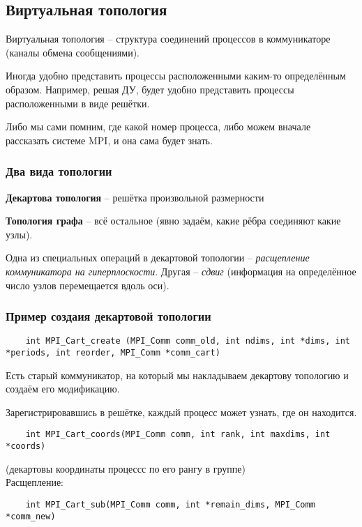 \documentclass[main.tex]{subfiles}
\begin{document}
\subsection{Виртуальная топология}

Виртуальная топология -- структура соединений процессов в коммуникаторе (каналы обмена сообщениями).

Иногда удобно представить процессы расположенными каким-то определённым образом.
Например, решая ДУ, будет удобно представить процессы расположенными в виде решётки.

Либо мы сами помним, где какой номер процесса, либо можем вначале рассказать системе MPI, и она сама будет знать.

\subsubsection{Два вида топологии}

\textbf{Декартова топология} -- решётка произвольной размерности

\textbf{Топология графа} -- всё остальное (явно задаём, какие рёбра соединяют какие узлы).

Одна из специальных операций в декартовой топологии -- \emph{расщепление коммуникатора на гиперплоскости}.
Другая -- \emph{сдвиг} (информация на определённое число узлов перемещается вдоль оси).

\subsubsection{Пример создаия декартовой топологии}

\begin{verbatim}
	int MPI_Cart_create (MPI_Comm comm_old, int ndims, int *dims, int *periods, int reorder, MPI_Comm *comm_cart)
\end{verbatim}

Есть старый коммуникатор, на который мы накладываем декартову топологию и создаём его модификацию.

Зарегистрировавшись в решётке, каждый процесс может узнать, где он находится.

\begin{verbatim}
	int MPI_Cart_coords(MPI_Comm comm, int rank, int maxdims, int *coords)
\end{verbatim}
(декартовы координаты процессс по его рангу в группе) \\

Расщепление:
\begin{verbatim}
	int MPI_Cart_sub(MPI_Comm comm, int *remain_dims, MPI_Comm *comm_new)
\end{verbatim}
\end{document}
